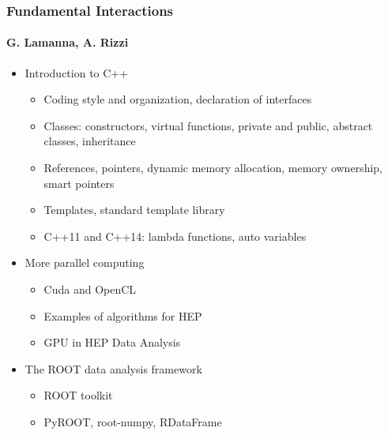 \documentclass[9pt]{beamer}
\begin{document}
\begin{frame}
  \frametitle{Fundamental Interactions}
  \framesubtitle{G. Lamanna, A. Rizzi}
  \begin{itemize}
  \item Introduction to C++
    \begin{itemize}
    \item Coding style and organization, declaration of interfaces
    \item Classes: constructors, virtual functions, private and public,
      abstract classes, inheritance
    \item References, pointers, dynamic memory allocation, memory ownership,
      smart pointers
    \item Templates, standard template library
    \item C++11 and C++14: lambda functions, auto variables
    \end{itemize}
  \item More parallel computing
    \begin{itemize}
    \item Cuda and OpenCL
    \item Examples of algorithms for HEP
    \item GPU in HEP Data Analysis
    \end{itemize}
  \item The ROOT data analysis framework
    \begin{itemize}
    \item ROOT toolkit
    \item PyROOT, root-numpy, RDataFrame
    \end{itemize}
  \end{itemize}
\end{frame}
\end{document}
